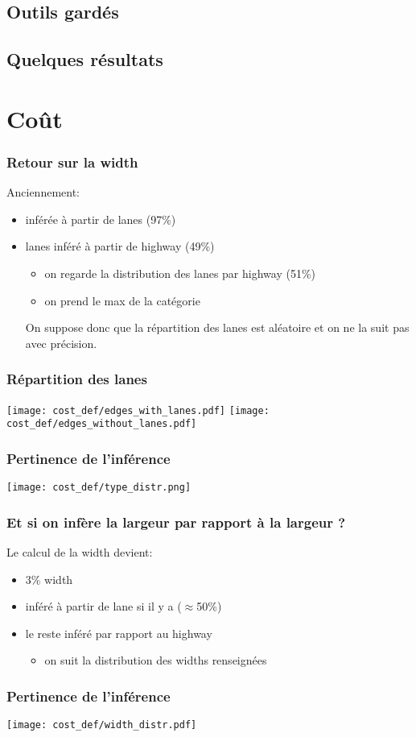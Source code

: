 \documentclass[aspectratio=169]{beamer}
\begin{document}
    \subsection{Outils gardés}
    \subsection{Quelques résultats}
    \section{Coût}
    \begin{frame}
        \frametitle{Retour sur la width}
        Anciennement:
        \begin{itemize}
            \item inférée à partir de lanes (97\%)
            \item lanes inféré à partir de highway (49\%)
            \begin{itemize}
                \item on regarde la distribution des lanes par highway (51\%)
                \item on prend le max de la catégorie
            \end{itemize}
            On suppose donc que la répartition des lanes est aléatoire et on ne la suit pas avec précision.
        \end{itemize}    
    \end{frame}

    \begin{frame}
        \frametitle{Répartition des lanes}
        \centering
        \texttt{[image: cost\_def/edges\_with\_lanes.pdf]}
        \texttt{[image: cost\_def/edges\_without\_lanes.pdf]}
    \end{frame}
    
    \begin{frame}
        \frametitle{Pertinence de l'inférence}
        \centering
        \texttt{[image: cost\_def/type\_distr.png]}
    \end{frame}

    \begin{frame}
        \frametitle{Et si on infère la largeur par rapport à la largeur ?}
        Le calcul de la width devient:
        \begin{itemize}
            \item 3\% width
            \item inféré à partir de lane si il y a ($\approx$50\%)
            \item le reste inféré par rapport au highway
            \begin{itemize}
                \item on suit la distribution des widths renseignées
            \end{itemize}
        \end{itemize}
    \end{frame}

    \begin{frame}
        \frametitle{Pertinence de l'inférence}
        \centering
        \texttt{[image: cost\_def/width\_distr.pdf]}
    \end{frame}
\end{document}
